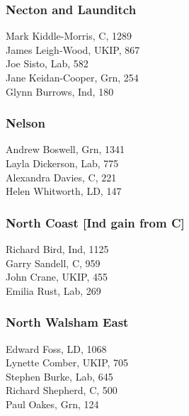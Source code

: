 \documentclass[a4paper,openany,10pt]{book}
\begin{document}
\subsubsection*{Necton and Launditch}



Mark Kiddle-Morris, C, 1289\\
James Leigh-Wood, UKIP, 867\\
Joe Sisto, Lab, 582\\
Jane Keidan-Cooper, Grn, 254\\
Glynn Burrows, Ind, 180\\


\subsubsection*{Nelson}



Andrew Boswell, Grn, 1341\\
Layla Dickerson, Lab, 775\\
Alexandra Davies, C, 221\\
Helen Whitworth, LD, 147\\


\subsubsection*{North Coast \hspace*{\fill}\nolinebreak[1]%
\enspace\hspace*{\fill}
[Ind gain from C]}



Richard Bird, Ind, 1125\\
Garry Sandell, C, 959\\
John Crane, UKIP, 455\\
Emilia Rust, Lab, 269\\


\subsubsection*{North Walsham East}



Edward Foss, LD, 1068\\
Lynette Comber, UKIP, 705\\
Stephen Burke, Lab, 645\\
Richard Shepherd, C, 500\\
Paul Oakes, Grn, 124\\
\end{document}
